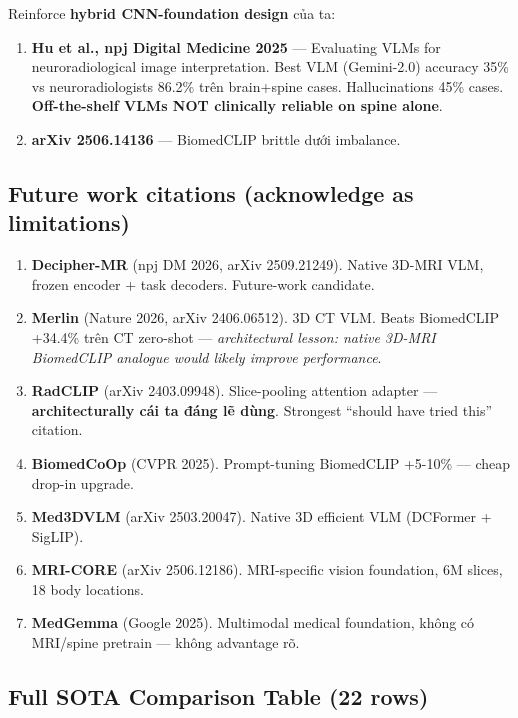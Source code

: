 \documentclass[11pt,a4paper]{article}
\newcommand{\bad}[1]{\textcolor{bad}{#1}}
\begin{document}
\noindent Reinforce \textbf{hybrid CNN-foundation design} của ta:

\begin{enumerate}[leftmargin=*]
\item \textbf{Hu et al., npj Digital Medicine 2025} --- Evaluating VLMs
for neuroradiological image interpretation. Best VLM (Gemini-2.0)
accuracy 35\% vs neuroradiologists 86.2\% trên brain+spine cases.
Hallucinations 45\% cases. \textbf{Off-the-shelf VLMs NOT clinically
reliable on spine alone}.
\item \textbf{arXiv 2506.14136} --- BiomedCLIP brittle dưới imbalance.
\end{enumerate}

\subsection{Future work citations (acknowledge as limitations)}

\begin{enumerate}[leftmargin=*]
\item \textbf{Decipher-MR} (npj DM 2026, arXiv 2509.21249). Native
3D-MRI VLM, frozen encoder + task decoders. Future-work candidate.
\item \textbf{Merlin} (Nature 2026, arXiv 2406.06512). 3D CT VLM.
Beats BiomedCLIP +34.4\% trên CT zero-shot --- \emph{architectural
lesson: native 3D-MRI BiomedCLIP analogue would likely improve
performance}.
\item \textbf{RadCLIP} (arXiv 2403.09948). Slice-pooling attention
adapter --- \textbf{architecturally cái ta đáng lẽ dùng}. Strongest
``should have tried this'' citation.
\item \textbf{BiomedCoOp} (CVPR 2025). Prompt-tuning BiomedCLIP +5-10\%
--- cheap drop-in upgrade.
\item \textbf{Med3DVLM} (arXiv 2503.20047). Native 3D efficient VLM
(DCFormer + SigLIP).
\item \textbf{MRI-CORE} (arXiv 2506.12186). MRI-specific vision
foundation, 6M slices, 18 body locations.
\item \textbf{MedGemma} (Google 2025). Multimodal medical foundation,
\bad{không có MRI/spine pretrain} --- không advantage rõ.
\end{enumerate}

\subsection{Full SOTA Comparison Table (22 rows)}
\end{document}
